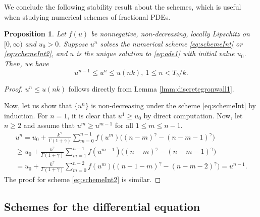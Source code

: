 \documentclass[12pt]{amsart}%
\newtheorem{pro}[thm]{Proposition}
\theoremstyle{definition}
\theoremstyle{remark}
\renewcommand{\ge}{\geqslant}
\renewcommand{\le}{\leqslant}
\begin{document}
We conclude the following stability result about the schemes, which is useful when studying numerical schemes of fractional PDEs.
\begin{pro}\label{pro:intnum}
Let $f(u)$ be nonnegative, non-decreasing, locally Lipschitz on $[0,\infty)$ and $u_0>0$. Suppose $u^n$ solves the numerical scheme \eqref{eq:schemeInt} or \eqref{eq:schemeInt2}, and $u$ is the unique solution to \eqref{eq:ode1} with initial value $u_0$. Then, we have \[
u^{n-1}\le u^n\le u(nk), ~1\le n< T_b/k.
\]
\end{pro}
\begin{proof}
$u^n\le u(nk)$ follows directly from Lemma \ref{lmm:discretegronwall1}.

Now, let us show that $\{u^{n}\}$ is non-decreasing under the scheme \eqref{eq:schemeInt} by induction. For $n=1$, it is clear that $u^1\ge u_0$ by direct computation. Now, let $n\ge 2$ and assume that $u^m\ge u^{m-1}$ for all $1\le m\le n-1$. 
\begin{multline*}
u^{n}=u_0+\frac{k^{\gamma}}{\Gamma(1+\gamma)}\sum_{m=0}^{n-1} f(u^{m})\Big((n-m)^{\gamma}-(n-m-1)^{\gamma}\Big)\\
\ge u_0+\frac{k^{\gamma}}{\Gamma(1+\gamma)}\sum_{m=1}^{n-1} f(u^{m-1})\Big((n-m)^{\gamma}-(n-m-1)^{\gamma}\Big)\\
= u_0+\frac{k^{\gamma}}{\Gamma(1+\gamma)}\sum_{m=0}^{n-2} f(u^{m})\Big((n-1-m)^{\gamma}-(n-m-2)^{\gamma}\Big)
=u^{n-1}.
\end{multline*} 
The proof for scheme \eqref{eq:schemeInt2} is similar.
\end{proof}

\subsection{Schemes for the differential equation}
\end{document}

